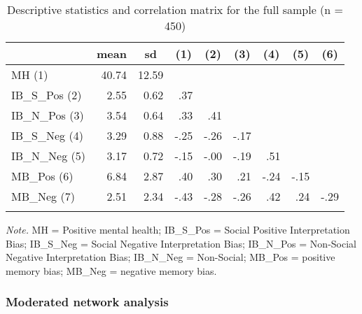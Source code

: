 \documentclass[
  english,
  man]{apa6}
\begin{document}
\begin{table}[tbp]

\begin{center}
\begin{threeparttable}

\caption{\label{tab:table1}Descriptive statistics and correlation matrix for the full sample (n = 450)}

\begin{tabular}{lrrrrrrrr}
\toprule
 & \multicolumn{1}{c}{mean} & \multicolumn{1}{c}{sd} & \multicolumn{1}{c}{(1)} & \multicolumn{1}{c}{(2)} & \multicolumn{1}{c}{(3)} & \multicolumn{1}{c}{(4)} & \multicolumn{1}{c}{(5)} & \multicolumn{1}{c}{(6)}\\
\midrule
MH (1) & 40.74 & 12.59 &  &  &  &  &  & \\
IB\_S\_Pos (2) & 2.55 & 0.62 & .37 &  &  &  &  & \\
IB\_N\_Pos (3) & 3.54 & 0.64 & .33 & .41 &  &  &  & \\
IB\_S\_Neg (4) & 3.29 & 0.88 & -.25 & -.26 & -.17 &  &  & \\
IB\_N\_Neg (5) & 3.17 & 0.72 & -.15 & -.00 & -.19 & .51 &  & \\
MB\_Pos (6) & 6.84 & 2.87 & .40 & .30 & .21 & -.24 & -.15 & \\
MB\_Neg (7) & 2.51 & 2.34 & -.43 & -.28 & -.26 & .42 & .24 & -.29\\
\bottomrule
\addlinespace
\end{tabular}

\begin{tablenotes}[para]
\normalsize{\textit{Note.} MH = Positive mental health; IB\_S\_Pos = Social Positive Interpretation Bias; IB\_S\_Neg = Social Negative Interpretation Bias; IB\_N\_Pos = Non-Social Negative Interpretation Bias; IB\_N\_Neg = Non-Social; MB\_Pos = positive memory bias; MB\_Neg = negative memory bias.}
\end{tablenotes}

\end{threeparttable}
\end{center}

\end{table}

\hypertarget{moderated-network-analysis}{%
\subsubsection{Moderated network analysis}\label{moderated-network-analysis}}
\end{document}
